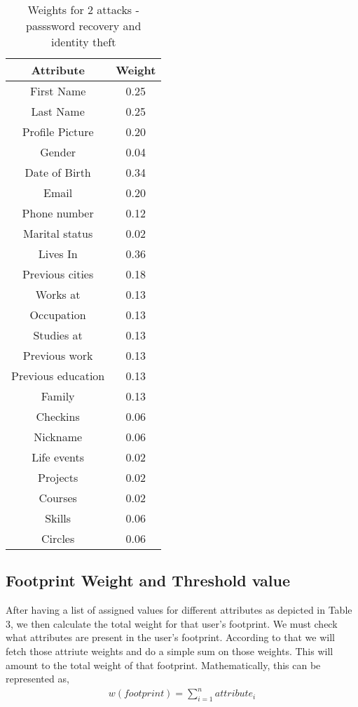 \documentclass[10pt,conference]{IEEEtran}
\begin{document}
\begin{table}
	\normalsize
	\centering
 		\begin{tabular}{|| c | c ||} 
 		\hline
 		Attribute & Weight \\  
		\hline\hline
		First Name &  0.25 \\
		\hline
		Last Name &  0.25 \\
		\hline
		Profile Picture & 0.20 \\
		\hline
		Gender &  0.04 \\
		\hline
		Date of Birth &  0.34\\
		\hline
		Email &  0.20 \\
		\hline
		Phone number &  0.12\\
		\hline
		Marital status &  0.02\\
		\hline
		Lives In &  0.36\\
		\hline
		Previous cities &  0.18\\
		\hline
		Works at &  0.13\\
		\hline
		Occupation &  0.13\\
		\hline
		Studies at &  0.13\\
		\hline
		Previous work &  0.13\\
		\hline
		Previous education & 0.13 \\
		\hline
		Family &  0.13\\
		\hline
		Checkins &  0.06\\
		\hline
		Nickname & 0.06 \\
		\hline
		Life events & 0.02 \\
		\hline
		Projects &  0.02 \\
		\hline
		Courses & 0.02 \\
		\hline
		Skills & 0.06 \\
		\hline		
		Circles & 0.06 \\
		\hline
	\end{tabular}
\caption{Weights for 2 attacks - passsword recovery and identity theft}
\end{table}

\subsection{Footprint Weight and Threshold value}
After having a list of assigned values for different attributes as depicted in Table 3, we then calculate the total weight for that user's footprint. We must check what attributes are present in the user's footprint. According to that we will fetch those attriute weights and do a simple sum on those weights. This will amount to the total weight of that footprint.
Mathematically, this can be represented as,
\begin{align*}
w(footprint) = \sum_{i=1}^{n}attribute_i
\end{align*}
\end{document}
